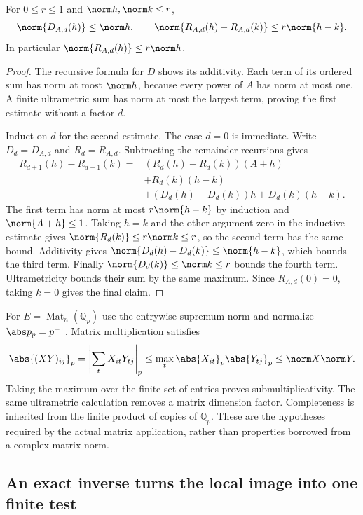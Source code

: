 \begin{lemma}
For $0\le r\le1$ and $\norm h,\norm k\le r$,
\[
 \norm{D_{A,d}(h)}\le\norm h,
 \qquad
 \norm{R_{A,d}(h)-R_{A,d}(k)}\le r\norm{h-k}.
\]
In particular $\norm{R_{A,d}(h)}\le r\norm h$.
\end{lemma}

\begin{proof}
The recursive formula for $D$ shows its additivity. Each term of its
ordered sum has norm at most $\norm h$, because every power of $A$ has
norm at most one. A finite ultrametric sum has norm at most the largest
term, proving the first estimate without a factor $d$.

Induct on $d$ for the second estimate. The case $d=0$ is immediate. Write
$D_d=D_{A,d}$ and $R_d=R_{A,d}$. Subtracting the remainder recursions gives
\begin{align*}
 R_{d+1}(h)-R_{d+1}(k)
 ={}&(R_d(h)-R_d(k))(A+h)\\
 &+R_d(k)(h-k)\\
 &+(D_d(h)-D_d(k))h+D_d(k)(h-k).
\end{align*}
The first term has norm at most $r\norm{h-k}$ by induction and
$\norm{A+h}\le1$. Taking $h=k$ and the other argument zero in the
inductive estimate gives $\norm{R_d(k)}\le r\norm k\le r$, so the
second term has the same bound. Additivity gives
$\norm{D_d(h)-D_d(k)}\le\norm{h-k}$, which bounds the third term.
Finally $\norm{D_d(k)}\le\norm k\le r$ bounds the fourth term.
Ultrametricity bounds their sum by the same maximum. Since $R_{A,d}(0)=0$,
taking $k=0$ gives the final claim.
\end{proof}

For $E=\operatorname{Mat}_n(\mathbb Q_p)$ use the entrywise supremum norm
and normalize $\abs p_p=p^{-1}$. Matrix multiplication satisfies
\[
 \abs{(XY)_{ij}}_p
 =\left|\sum_tX_{it}Y_{tj}\right|_p
 \le\max_t\abs{X_{it}}_p\abs{Y_{tj}}_p
 \le\norm X\norm Y.
\]
Taking the maximum over the finite set of entries proves
submultiplicativity. The same ultrametric calculation removes a matrix
dimension factor. Completeness is inherited from the finite product of
copies of $\mathbb Q_p$. These are the hypotheses required by the actual
matrix application, rather than properties borrowed from a complex matrix
norm.

\subsection{An exact inverse turns the local image into one finite test}

